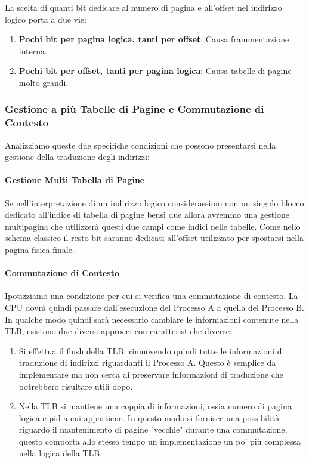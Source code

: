\documentclass{article}
\begin{document}
La scelta di quanti bit dedicare al numero di pagina e all'offset nel indirizzo logico porta a due vie:

\begin{enumerate}
    \item \textbf{Pochi bit per pagina logica, tanti per offset}: Causa frammentazione interna.
    \item \textbf{Pochi bit per offset, tanti per pagina logica}: Causa tabelle di pagine molto grandi.
\end{enumerate}

\newpage

\subsubsection{Gestione a più Tabelle di Pagine e Commutazione di Contesto} Analizziamo queste due specifiche condizioni che possono presentarsi nella gestione della traduzione degli indirizzi:

\paragraph{Gestione Multi Tabella di Pagine} Se nell'interpretazione di un indirizzo logico considerassimo non un singolo blocco dedicato all'indice di tabella di pagine bensì due allora avremmo una gestione multipagina che utilizzerà
questi due campi come indici nelle tabelle. Come nello schema classico il resto bit saranno dedicati all'offset utilizzato per spostarsi nella pagina fisica finale.

\paragraph{Commutazione di Contesto} Ipotizziamo una condizione per cui si verifica una commutazione di contesto. La CPU dovrà quindi passare dall'esecuzione del Processo A a quella del Processo B. In qualche modo quindi sarà necessario cambiare le informazioni contenute nella TLB, esistono due diversi approcci con caratteristiche diverse:

\begin{enumerate}
    \item Si effettua il flush della TLB, rimuovendo quindi tutte le informazioni di traduzione di indirizzi riguardanti il Processo A. Questo è semplice da implementare ma non cerca di preservare informazioni di traduzione che potrebbero risultare utili dopo.
    \item Nella TLB si mantiene una coppia di informazioni, ossia numero di pagina logica e pid a cui appartiene. In questo modo si fornisce una possibilità riguardo il mantenimento di pagine "vecchie" durante una commutazione, questo comporta allo stesso tempo un implementazione un po' più complessa nella logica della TLB.
\end{enumerate}
\end{document}
